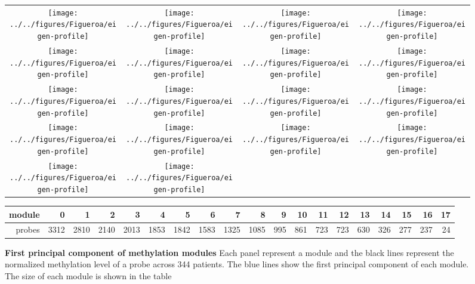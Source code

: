 \documentclass{article}
\begin{document}
\begin{figure}[htbp]
\begin{center}
\begin{tabular}{@{}c@{\hspace{.0cm}}@{\hspace{.0cm}}c@{\hspace{.0cm}}c@{\hspace{.0cm}}c@{}}
\texttt{[image: ../../figures/Figueroa/eigen-profile]} &
\texttt{[image: ../../figures/Figueroa/eigen-profile]} &
\texttt{[image: ../../figures/Figueroa/eigen-profile]} &
\texttt{[image: ../../figures/Figueroa/eigen-profile]} \\
\texttt{[image: ../../figures/Figueroa/eigen-profile]} &
\texttt{[image: ../../figures/Figueroa/eigen-profile]} & 
\texttt{[image: ../../figures/Figueroa/eigen-profile]} &
\texttt{[image: ../../figures/Figueroa/eigen-profile]} \\
\texttt{[image: ../../figures/Figueroa/eigen-profile]} &
\texttt{[image: ../../figures/Figueroa/eigen-profile]} & 
\texttt{[image: ../../figures/Figueroa/eigen-profile]} &
\texttt{[image: ../../figures/Figueroa/eigen-profile]} \\
\texttt{[image: ../../figures/Figueroa/eigen-profile]} &
\texttt{[image: ../../figures/Figueroa/eigen-profile]} & 
\texttt{[image: ../../figures/Figueroa/eigen-profile]} &
\texttt{[image: ../../figures/Figueroa/eigen-profile]} \\
\texttt{[image: ../../figures/Figueroa/eigen-profile]} &
\texttt{[image: ../../figures/Figueroa/eigen-profile]} \\
\end{tabular}
\begin{small}
\begin{tabular}{rrrrrrrrrrrrrrrrrrr}
  \hline
module & 0 & 1 & 2 & 3 & 4 & 5 & 6 & 7 & 8 & 9 & 10 & 11 & 12 & 13 & 14 & 15 & 16 & 17 \\ 
  \hline
probes & 3312 & 2810 & 2140 & 2013 & 1853 & 1842 & 1583 & 1325 & 1085 & 995 & 861 & 723 & 723 & 630 & 326 & 277 & 237 &  24 \\ 
   \hline
\end{tabular}
\end{small}
\caption[First principal component of methylation modules]{\textbf{First principal component of methylation modules} Each panel represent a module and the black lines represent the normalized methylation level of a probe across 344 patients. The blue lines show the first principal component of each module. The size of each module is shown in the table}
\label{eigenGene}
\end{center}
\end{figure}
\end{document}

